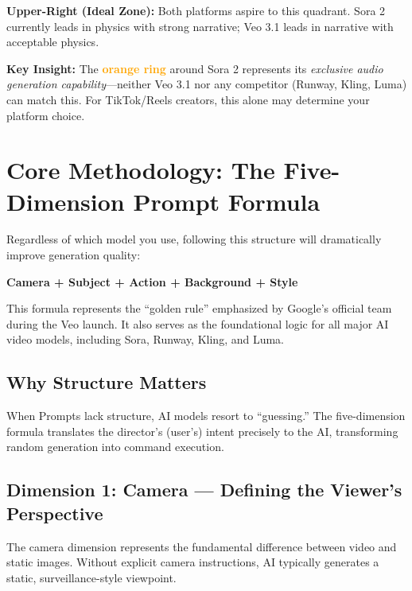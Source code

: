 \begin{resultbox}
\textbf{Upper-Right (Ideal Zone):} Both platforms aspire to this quadrant. Sora 2 currently leads in physics with strong narrative; Veo 3.1 leads in narrative with acceptable physics.

\textbf{Key Insight:} The \textcolor{orange}{\textbf{orange ring}} around Sora 2 represents its \textit{exclusive audio generation capability}---neither Veo 3.1 nor any competitor (Runway, Kling, Luma) can match this. For TikTok/Reels creators, this alone may determine your platform choice.
\end{resultbox}

\section{Core Methodology: The Five-Dimension Prompt Formula}
\label{sec:five-dimension-formula}

\begin{yellowbox}
Regardless of which model you use, following this structure will dramatically improve generation quality:

\vspace{0.5em}
\centering
\large\textbf{Camera + Subject + Action + Background + Style}
\end{yellowbox}

This formula represents the ``golden rule'' emphasized by Google's official team during the Veo launch. It also serves as the foundational logic for all major AI video models, including Sora, Runway, Kling, and Luma.

\subsection{Why Structure Matters}

When Prompts lack structure, AI models resort to ``guessing.'' The five-dimension formula translates the director's (user's) intent precisely to the AI, transforming random generation into command execution.

\subsection{Dimension 1: Camera --- Defining the Viewer's Perspective}
\label{subsec:dim-camera}

The camera dimension represents the fundamental difference between video and static images. Without explicit camera instructions, AI typically generates a static, surveillance-style viewpoint.

